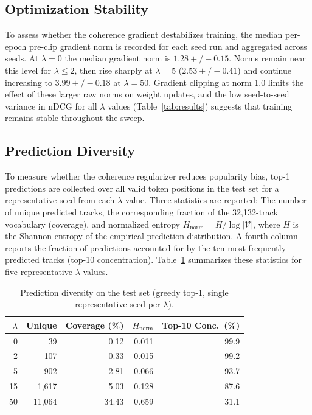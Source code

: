 \documentclass[conference]{IEEEtran}
\begin{document}
\subsection{Optimization Stability}

To assess whether the coherence gradient destabilizes training, the median per-epoch pre-clip gradient norm is recorded
for each seed run and aggregated across seeds. At $\lambda=0$ the median gradient norm is $1.28 +/- 0.15$. Norms remain near
this level for $\lambda\leq2$, then rise sharply at $\lambda=5$ ($2.53 +/- 0.41$) and continue
increasing to $3.99 +/- 0.18$ at $\lambda=50$. Gradient clipping at norm 1.0 limits the effect of these larger raw norms
on weight updates, and the low seed-to-seed variance in nDCG for all $\lambda$ values (Table~\ref{tab:results}) suggests
that training remains stable throughout the sweep.

\subsection{Prediction Diversity}

To measure whether the coherence regularizer reduces popularity bias, top-1 predictions are collected over all
valid token positions in the test set for a representative seed from each $\lambda$ value. Three statistics are reported:
The number of unique predicted tracks, the corresponding fraction of the 32,132-track vocabulary
(coverage), and normalized entropy $H_\text{norm} = H / \log|\mathcal{V}|$, where $H$ is the
Shannon entropy of the empirical prediction distribution. A fourth column reports the fraction of predictions
accounted for by the ten most frequently predicted tracks (top-10 concentration). Table~\ref{tab:diversity}
summarizes these statistics for five representative $\lambda$ values.

\begin{table}[ht]
\centering
\caption{Prediction diversity on the test set (greedy top-1, single representative seed per $\lambda$).}
\label{tab:diversity}
\begin{tabular}{r|r|r|r|r}
\hline
$\lambda$ & Unique & Coverage (\%) & $H_\text{norm}$ & Top-10 Conc.\ (\%) \\
\hline
0 & 39 & 0.12 & 0.011 & 99.9 \\
2 & 107 & 0.33 & 0.015 & 99.2 \\
5 & 902 & 2.81 & 0.066 & 93.7 \\
15 & 1,617 & 5.03 & 0.128 & 87.6 \\
50 & 11,064 & 34.43 & 0.659 & 31.1 \\
\hline
\end{tabular}
\end{table}
\end{document}
